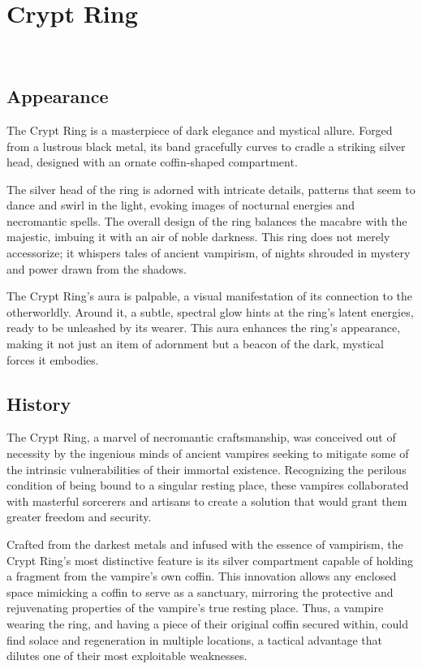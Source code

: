 
\chapter*{Crypt Ring}
\\

\section*{Appearance}
The Crypt Ring is a masterpiece of dark elegance and mystical allure. Forged from a lustrous black metal, its band gracefully curves to cradle a striking silver head, designed with an ornate coffin-shaped compartment.

The silver head of the ring is adorned with intricate details, patterns that seem to dance and swirl in the light, evoking images of nocturnal energies and necromantic spells. The overall design of the ring balances the macabre with the majestic, imbuing it with an air of noble darkness. This ring does not merely accessorize; it whispers tales of ancient vampirism, of nights shrouded in mystery and power drawn from the shadows.

The Crypt Ring's aura is palpable, a visual manifestation of its connection to the otherworldly. Around it, a subtle, spectral glow hints at the ring's latent energies, ready to be unleashed by its wearer. This aura enhances the ring's appearance, making it not just an item of adornment but a beacon of the dark, mystical forces it embodies.

\eject

\section*{History}
The Crypt Ring, a marvel of necromantic craftsmanship, was conceived out of necessity by the ingenious minds of ancient vampires seeking to mitigate some of the intrinsic vulnerabilities of their immortal existence. Recognizing the perilous condition of being bound to a singular resting place, these vampires collaborated with masterful sorcerers and artisans to create a solution that would grant them greater freedom and security.

Crafted from the darkest metals and infused with the essence of vampirism, the Crypt Ring's most distinctive feature is its silver compartment capable of holding a fragment from the vampire's own coffin. This innovation allows any enclosed space mimicking a coffin to serve as a sanctuary, mirroring the protective and rejuvenating properties of the vampire's true resting place. Thus, a vampire wearing the ring, and having a piece of their original coffin secured within, could find solace and regeneration in multiple locations, a tactical advantage that dilutes one of their most exploitable weaknesses.

